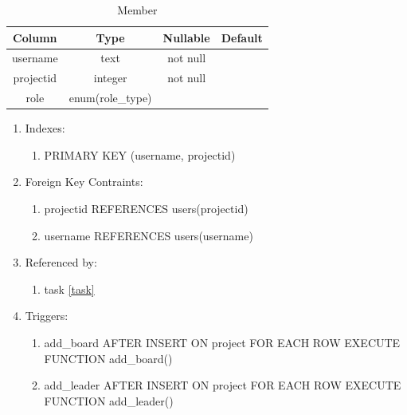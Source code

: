 \documentclass[conference]{IEEEtran}
\begin{document}
\begin{table}[htbp]
  \caption{Member}
  \begin{center}
    \begin{tabular}{|c|c|c|c|}
      \hline
      \textbf{Column} & \textbf{Type} & \textbf{Nullable} & \textbf{Default}\\
      \hline
      username & text & not null &\\
      projectid & integer & not null &\\
      role & enum(role\_type) &&\\
      \hline
    \end{tabular}
    \begin{enumerate}
    \item Indexes:
      \begin{enumerate}
      \item PRIMARY KEY (username, projectid)
      \end{enumerate}
    \item Foreign Key Contraints:
      \begin{enumerate}
      \item projectid REFERENCES users(projectid)
      \item username REFERENCES users(username)
      \end{enumerate}
    \item Referenced by:
      \begin{enumerate}
      \item task \ref{task}
      \end{enumerate}
    \item Triggers:
      \begin{enumerate}
        \item add\_board AFTER INSERT ON project FOR EACH ROW EXECUTE FUNCTION add\_board()
        \item add\_leader AFTER INSERT ON project FOR EACH ROW EXECUTE FUNCTION add\_leader()
      \end{enumerate}
    \end{enumerate}
    \label{member}
  \end{center}
\end{table}
\end{document}
